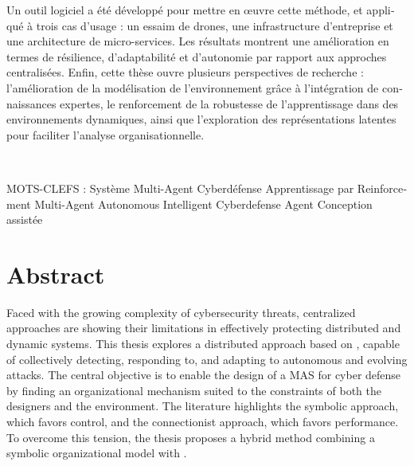 \begin{otherlanguage}{ngerman}
  Un outil logiciel a été développé pour mettre en œuvre cette méthode, et appliqué à trois cas d'usage : un essaim de drones, une infrastructure d'entreprise et une architecture de micro-services. Les résultats montrent une amélioration en termes de résilience, d'adaptabilité et d'autonomie par rapport aux approches centralisées.
  Enfin, cette thèse ouvre plusieurs perspectives de recherche : l'amélioration de la modélisation de l'environnement grâce à l'intégration de connaissances expertes, le renforcement de la robustesse de l'apprentissage dans des environnements dynamiques, ainsi que l'exploration des représentations latentes pour faciliter l'analyse organisationnelle.

  \medskip

  \

  \noindent MOTS-CLEFS :
  Système Multi-Agent \raisebox{0.25ex}{\tiny$\bullet$} Cyberdéfense \raisebox{0.25ex}{\tiny$\bullet$} Apprentissage par Reinforcement Multi-Agent \raisebox{0.25ex}{\tiny$\bullet$} Autonomous Intelligent Cyberdefense Agent \raisebox{0.25ex}{\tiny$\bullet$} Conception assistée

\end{otherlanguage}

\clearpage
\thispagestyle{empty}
\null
\newpage

\chapter*{Abstract}

Faced with the growing complexity of cybersecurity threats, centralized approaches are showing their limitations in effectively protecting distributed and dynamic systems. This thesis explores a distributed approach based on , capable of collectively detecting, responding to, and adapting to autonomous and evolving attacks.
%
The central objective is to enable the design of a MAS for cyber defense by finding an organizational mechanism suited to the constraints of both the designers and the environment. The literature highlights the symbolic approach, which favors control, and the connectionist approach, which favors performance. To overcome this tension, the thesis proposes a hybrid method combining a symbolic organizational model with .

